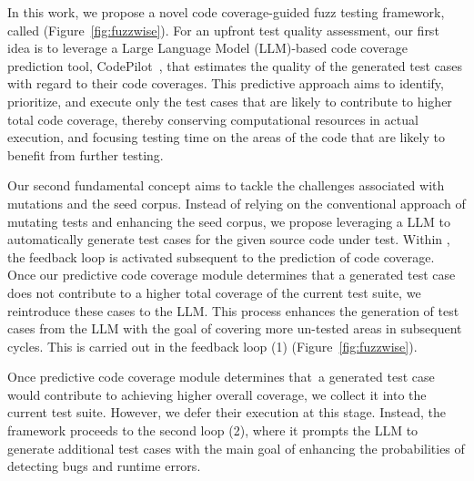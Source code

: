 

In this work, we propose a novel code coverage-guided fuzz testing
framework, called {\tool} (Figure~\ref{fig:fuzzwise}). For an upfront
test quality assessment, our first idea is to leverage a Large
Language Model (LLM)-based code coverage prediction tool,
CodePilot~\cite{forge24}, that estimates the quality of the generated
test cases with regard to their code coverages. This predictive
approach aims to identify, prioritize, and execute only the test cases
that are likely to contribute to higher total code coverage, thereby conserving
computational resources in actual execution, and focusing testing time
on the areas of the code that are likely to benefit from further
testing.

Our second fundamental concept aims to tackle the challenges
associated with mutations and the seed corpus. Instead of relying on
the conventional approach of mutating tests and enhancing the seed
corpus, we propose leveraging a LLM to automatically generate test
cases for the given source code under test. Within {\tool}, the
feedback loop is activated subsequent to the prediction of code
coverage. Once our predictive code coverage module determines that a
generated test case does not contribute to a higher total coverage of
the current test suite, we reintroduce these cases to the LLM.
This process enhances the generation of test cases from the LLM with
the goal of covering more un-tested areas in subsequent cycles. This
is carried out in the feedback loop (1) (Figure~\ref{fig:fuzzwise}).

Once predictive code coverage module determines that~a generated
test case would contribute to achieving higher overall coverage, we
collect it into the current test suite. However, we defer their
execution at this stage. Instead, the framework proceeds to the second
loop (2), where it prompts the LLM to generate additional test cases
with the main goal of enhancing the probabilities of detecting bugs and
runtime errors.

